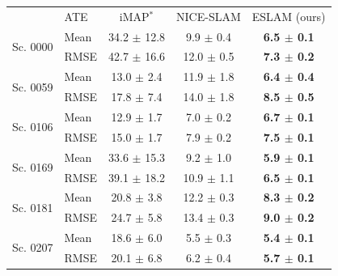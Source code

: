 \begin{table}[t]
    \begin{center}
        \begin{tabular}{ll|ccc}
            \Xhline{2\arrayrulewidth}
            \multirow{2}{*}{Scene} & \multirow{2}{*}{ATE} & \multirow{2}{*}{iMAP$^{*}$} & \multirow{2}{*}{NICE-SLAM} & \multirow{2}{*}{ESLAM (ours)} \\
            &\\
            \hline
            \multirow{2}{*}{Sc. 0000} & Mean & 34.2 $\pm$ 12.8 & \phantom{0}9.9 $\pm$ 0.4 & \textbf{6.5 $\pm$ 0.1} \\
            & RMSE & 42.7 $\pm$ 16.6 & 12.0 $\pm$ 0.5 & \textbf{7.3 $\pm$ 0.2} \\
            
            \hline
            \multirow{2}{*}{Sc. 0059} & Mean & 13.0 $\pm$ \phantom{0}2.4 & 11.9 $\pm$ 1.8 & \textbf{6.4 $\pm$ 0.4} \\
            & RMSE & 17.8 $\pm$ \phantom{0}7.4 & 14.0 $\pm$ 1.8 & \textbf{8.5 $\pm$ 0.5} \\
            
            \hline
            \multirow{2}{*}{Sc. 0106} & Mean & 12.9 $\pm$ \phantom{0}1.7 & \phantom{0}7.0 $\pm$ 0.2 & \textbf{6.7 $\pm$ 0.1} \\
            & RMSE & 15.0 $\pm$ \phantom{0}1.7 & \phantom{0}7.9 $\pm$ 0.2 & \textbf{7.5 $\pm$ 0.1} \\

            \hline
            \multirow{2}{*}{Sc. 0169} & Mean &  33.6 $\pm$ 15.3 & \phantom{0}9.2 $\pm$ 1.0 & \textbf{5.9 $\pm$ 0.1} \\
            & RMSE & 39.1 $\pm$ 18.2 & 10.9 $\pm$ 1.1 & \textbf{6.5 $\pm$ 0.1} \\

            \hline
            \multirow{2}{*}{Sc. 0181} & Mean & 20.8 $\pm$ \phantom{0}3.8 & 12.2 $\pm$ 0.3 & \textbf{8.3 $\pm$ 0.2}  \\
            & RMSE & 24.7 $\pm$ \phantom{0}5.8 & 13.4 $\pm$ 0.3 & \textbf{9.0 $\pm$ 0.2} \\

            \hline
            \multirow{2}{*}{Sc. 0207} & Mean & 18.6 $\pm$ \phantom{0}6.0 & \phantom{0}5.5 $\pm$ 0.3 & \textbf{5.4 $\pm$ 0.1} \\
            & RMSE & 20.1 $\pm$ \phantom{0}6.8 & \phantom{0}6.2 $\pm$ 0.4 & \textbf{5.7 $\pm$ 0.1} \\


\end{tabular}
\end{center}
\end{table}
